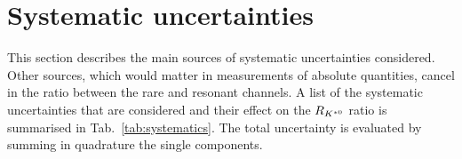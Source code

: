 \section{Systematic uncertainties}
\label{sec:systematics}

This section describes the main sources of systematic uncertainties considered.
Other sources, which would matter in measurements of absolute quantities,
cancel in the ratio between the rare and resonant channels.
%
A list of the systematic uncertainties that are considered and their effect on the $R_{{{K}^{*0}}}$
ratio is summarised in Tab.~\ref{tab:systematics}.
The total uncertainty is evaluated by summing in quadrature the single components.

\begin{table}[t!]
\begin{center}
\caption{Summary of the relative percent systematic uncertainties on \RKst.}
\renewcommand\arraystretch{1.25}
\label{tab:systematics}
\end{center}
\end{table}
